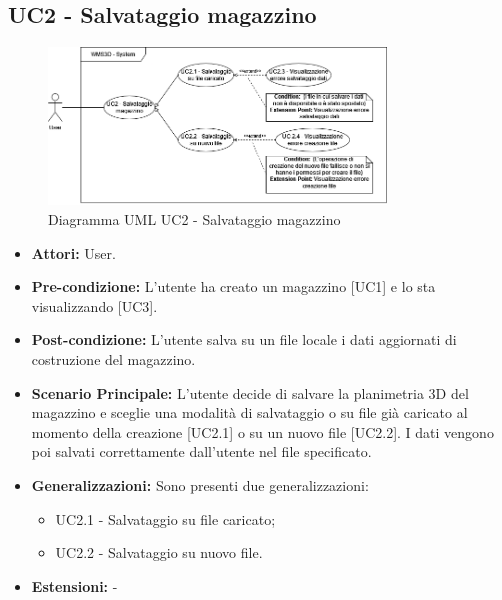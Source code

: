 \subsection{UC2 - Salvataggio magazzino}
\begin{figure}[H]
  \centering
  \includegraphics[width=0.8\textwidth]{UC_diagrams_1-10/UC2_sys.drawio.png}
   \caption{Diagramma UML UC2 - Salvataggio magazzino}
\end{figure}
\begin{itemize}
    \item \textbf{Attori:} User.
    \item \textbf{Pre-condizione:} L'utente ha creato un magazzino [UC1] e lo sta visualizzando [UC3].
    \item \textbf{Post-condizione:} L'utente salva su un file locale i dati aggiornati di costruzione del magazzino.
    \item \textbf{Scenario Principale:} L'utente decide di salvare la planimetria 3D del magazzino e sceglie una modalità di salvataggio o su file già caricato al momento della creazione [UC2.1] o su un nuovo file [UC2.2]. I dati vengono poi salvati correttamente dall'utente nel file specificato.
    \item \textbf{Generalizzazioni:} Sono presenti due generalizzazioni:
    \begin{itemize}
        \item UC2.1 - Salvataggio su file caricato;
        \item UC2.2 - Salvataggio su nuovo file.
    \end{itemize}
    \item \textbf{Estensioni:} -
\end{itemize}


